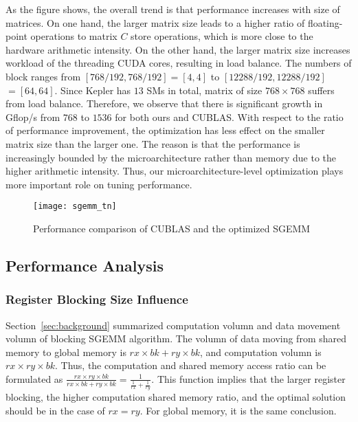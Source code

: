 As the figure shows, the overall trend is that performance increases with size of matrices. On one hand, the larger matrix size leads to a higher ratio of floating-point operations to matrix $C$ store operations, which is more close to the hardware arithmetic intensity. On the other hand, the larger matrix size increases workload of the threading CUDA cores, resulting in load balance. The numbers of block ranges from $[768/192,768/192]=[4,4]$ to $[12288/192, 12288/192]$ $=[64,64]$. Since Kepler has $13$ SMs in total, matrix of size $768\times 768$ suffers from load balance. Therefore, we observe that there is significant growth in Gflop/s from $768$ to $1536$ for both ours and CUBLAS. With respect to the ratio of performance improvement, the optimization has less effect on the smaller matrix size than the larger one. The reason is that the performance is increasingly bounded by the microarchitecture rather than memory due to the higher arithmetic intensity. Thus, our microarchitecture-level optimization plays more important role on tuning performance.

\begin{figure}[htbp]
\begin{center}
\texttt{[image: sgemm\_tn]}
\caption{Performance comparison of CUBLAS and the optimized SGEMM }
\label{fig:sgemm_tn}
\end{center}
\end{figure}

\subsection{Performance Analysis}

\subsubsection{Register Blocking Size Influence}
Section~\ref{sec:background} summarized computation volumn and data movement volumn of blocking SGEMM algorithm.
The volumn of data moving from shared memory to global memory is $rx\times bk+ ry\times bk$, and computation volumn is $rx\times ry\times bk$. Thus, the computation and shared memory access ratio can be formulated as $\frac {rx\times ry\times bk} {rx\times bk+ ry\times bk} = \frac{1}{\frac{1}{rx} + \frac{1}{ry}}$.
This function implies that the larger register blocking, the higher computation shared memory ratio, and the optimal solution should be in the case of $rx=ry$. 
For global memory, it is the same conclusion.

